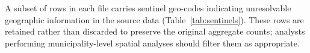\documentclass[3p]{elsarticle}
\begin{document}
  A subset of rows in each file carries sentinel geo-codes indicating
  unresolvable geographic information in the source data                                                                                                                                      
  (Table~\ref{tab:sentinels}).                                                                                                                                                              
  These rows are retained rather than discarded to preserve                                                                                                                                 
  the original aggregate counts; analysts performing
  municipality-level spatial analyses should filter them as                                                                                                                                   
  appropriate.
\end{document}
